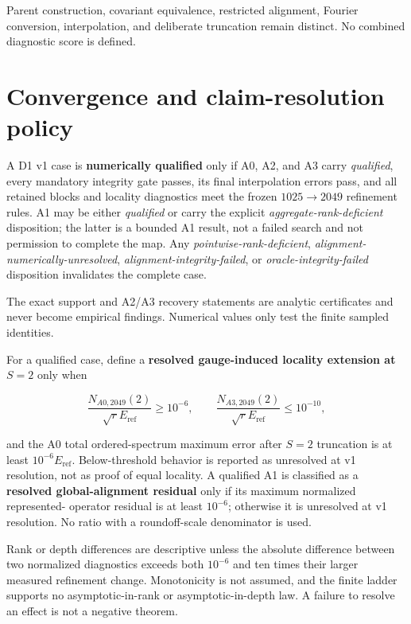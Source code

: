 \documentclass[11pt]{article}
\begin{document}
Parent construction, covariant equivalence, restricted alignment, Fourier conversion,
interpolation, and deliberate truncation remain distinct. No combined diagnostic score
is defined.

\section{Convergence and claim-resolution policy}

A D1 v1 case is \textbf{numerically qualified} only if A0, A2, and A3 carry
\emph{qualified}, every mandatory integrity gate passes, its final interpolation errors
pass, and all retained blocks and locality diagnostics meet the frozen
$1025\rightarrow2049$ refinement rules. A1 may be either \emph{qualified} or carry the
explicit \emph{aggregate-rank-deficient} disposition; the latter is a bounded A1 result,
not a failed search and not permission to complete the map. Any
\emph{pointwise-rank-deficient}, \emph{alignment-numerically-unresolved},
\emph{alignment-integrity-failed}, or \emph{oracle-integrity-failed} disposition
invalidates the complete case.

The exact support and A2/A3 recovery statements are analytic certificates and never
become empirical findings. Numerical values only test the finite sampled identities.

For a qualified case, define a \textbf{resolved gauge-induced locality extension at $S=2$}
only when

\[
\frac{N_{A0,2049}(2)}{\sqrt rE_{\mathrm{ref}}}\geq10^{-6},
\qquad
\frac{N_{A3,2049}(2)}{\sqrt rE_{\mathrm{ref}}}\leq10^{-10},
\]

and the A0 total ordered-spectrum maximum error after $S=2$ truncation is at least
$10^{-6}E_{\mathrm{ref}}$. Below-threshold behavior is reported as unresolved at v1
resolution, not as proof of equal locality. A qualified A1 is classified as a
\textbf{resolved global-alignment residual} only if its maximum normalized represented-
operator residual is at least $10^{-6}$; otherwise it is unresolved at v1 resolution.
No ratio with a roundoff-scale denominator is used.

Rank or depth differences are descriptive unless the absolute difference between two
normalized diagnostics exceeds both $10^{-6}$ and ten times their larger measured
refinement change. Monotonicity is not assumed, and the finite ladder supports no
asymptotic-in-rank or asymptotic-in-depth law. A failure to resolve an effect is not a
negative theorem.
\end{document}
